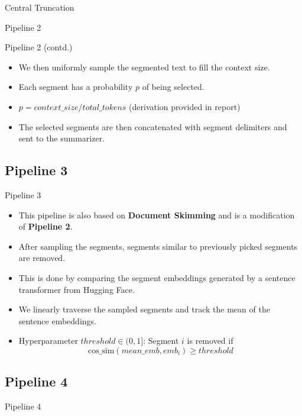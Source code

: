 \begin{frame}{Central Truncation}
\begin{frame}{Pipeline 2}
\end{frame}

\begin{frame}{Pipeline 2 (contd.)}
	
	\begin{itemize}
		\item We then uniformly sample the segmented text to fill the context size.
		\item<2-> Each segment has a probability $p$ of being selected.
		\item<3-> $ p = context\_size / total\_tokens $
		(derivation provided in report)
		\item<4-> The selected segments are then concatenated with segment delimiters
		and sent to the summarizer.
	\end{itemize}

\end{frame}


\subsection{Pipeline 3}

\begin{frame}{Pipeline 3}

	\begin{itemize}
		\item This pipeline is also based on \textbf{Document Skimming} and is a modification
		of \textbf{Pipeline 2}.
		\item<2-> After sampling the segments, segments similar to previously picked
		segments are removed.
		\item<3-> This is done by comparing the segment embeddings generated by
		a sentence transformer from Hugging Face.
		\item<4-> We linearly traverse the sampled segments and track the mean of the
		sentence embeddings.
		\item<5> Hyperparameter $threshold \in (0, 1]$: Segment $i$ is removed if
		\[ \mathrm{cos\_sim}(mean\_emb, emb_i) \ge threshold \]
	\end{itemize}

\end{frame}


\subsection{Pipeline 4}

\begin{frame}{Pipeline 4}


\end{frame}
\end{frame}
